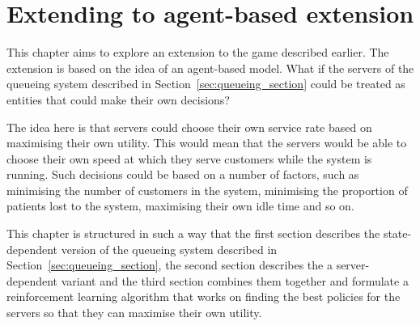 \chapter{Extending to agent-based extension}

This chapter aims to explore an extension to the game described earlier.
The extension is based on the idea of an agent-based model.
What if the servers of the queueing system described in
Section~\ref{sec:queueing_section} could be treated as entities that could make
their own decisions?

The idea here is that servers could choose their own service rate based on
maximising their own utility.
This would mean that the servers would be able to choose their own speed at
which they serve customers while the system is running.
Such decisions could be based on a number of factors, such as minimising the
number of customers in the system, minimising the proportion of patients lost
to the system, maximising their own idle time and so on.

This chapter is structured in such a way that the first section describes the
state-dependent version of the queueing system described in
Section~\ref{sec:queueing_section}, the second section describes the
a server-dependent variant and the third section combines them together and
formulate a reinforcement learning algorithm that works on finding the best
policies for the servers so that they can maximise their own utility.











